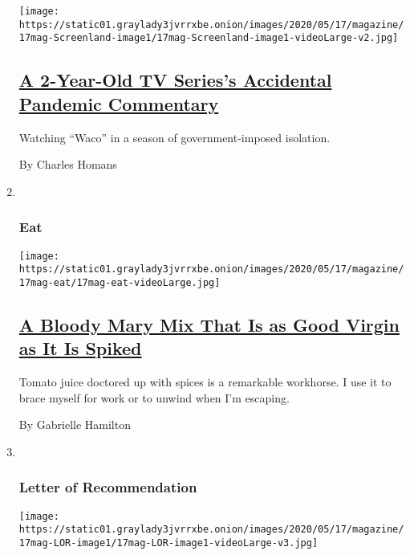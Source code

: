 \begin{enumerate}
  \texttt{[image: https://static01.graylady3jvrrxbe.onion/images/2020/05/17/magazine/17mag-Screenland-image1/17mag-Screenland-image1-videoLarge-v2.jpg]}

  \hypertarget{a-2-year-old-tv-seriess-accidental-pandemic-commentary}{%
  \subsection{\texorpdfstring{\href{/2020/05/14/magazine/a-2-year-old-tv-seriess-accidental-pandemic-commentary.html}{A
  2-Year-Old TV Series's Accidental Pandemic
  Commentary}}{A 2-Year-Old TV Series's Accidental Pandemic Commentary}}\label{a-2-year-old-tv-seriess-accidental-pandemic-commentary}}

  Watching ``Waco'' in a season of government-imposed isolation.

  By Charles Homans
\item ~
  \hypertarget{eat}{%
  \subsubsection{Eat}\label{eat}}

  \texttt{[image: https://static01.graylady3jvrrxbe.onion/images/2020/05/17/magazine/17mag-eat/17mag-eat-videoLarge.jpg]}

  \hypertarget{a-bloody-mary-mix-that-is-as-good-virgin-as-it-is-spiked}{%
  \subsection{\texorpdfstring{\href{/2020/05/13/magazine/bloody-mary-mix-recipe.html}{A
  Bloody Mary Mix That Is as Good Virgin as It Is
  Spiked}}{A Bloody Mary Mix That Is as Good Virgin as It Is Spiked}}\label{a-bloody-mary-mix-that-is-as-good-virgin-as-it-is-spiked}}

  Tomato juice doctored up with spices is a remarkable workhorse. I use
  it to brace myself for work or to unwind when I'm escaping.

  By Gabrielle Hamilton
\item ~
  \hypertarget{letter-of-recommendation}{%
  \subsubsection{Letter of
  Recommendation}\label{letter-of-recommendation}}

  \texttt{[image: https://static01.graylady3jvrrxbe.onion/images/2020/05/17/magazine/17mag-LOR-image1/17mag-LOR-image1-videoLarge-v3.jpg]}


\end{enumerate}
